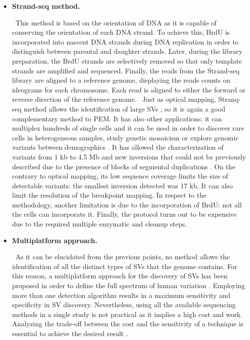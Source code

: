 \documentclass{article}
\begin{document}
\begin{itemize}
\item {\bf Strand-seq method.}

\
This method is based on the orientation of DNA as it is capable of conserving the orientation of each DNA strand. To achieve this, BrdU is incorporated into nascent DNA strands during DNA replication in order to distinguish between parental and daughter strands. Later, during the library preparation, the BrdU strands are selectively removed so that only template strands are amplified and sequenced. Finally, the reads from the Strand-seq library are aligned to a reference genome, displaying the reads counts on ideograms for each chromosome. Each read is aligned to either the forward or reverse direction of the reference genome.  
\
Just as optical mapping, Stranq-seq method allows the identification of large SVs \cite{sanders_characterizing_2016}, so it is again a good complementary method to PEM. It has also other applications: it can multiplex hundreds of single cells and it can be used in order to discover rare cells in heterogeneous samples, study genetic mosaicism or explore genomic variants between demographics \cite{sanders_characterizing_2016}. It has allowed the characterization of variants from 1 kb to 4.5 Mb and new inversions that could not be previously described due to the presence of blocks of segmental duplications \cite{sanders_characterizing_2016}. On the contrary to optical mapping, its low sequence coverage limits the size of detectable variants: the smallest inversion detected was 17 kb. It can also limit the resolution of the breakpoint mapping. In respect to the methodology, another limitation is due to the incorporation of BrdU: not all the cells can incorporate it. Finally, the protocol turns out to be expensive due to the required multiple enzymatic and cleanup steps.

\item {\bf Multiplatform approach.} 

\
As it can be elucidated from the previous points, no method allows the identification of all the distinct types of SVs that the genome contains. For this reason, a multiplatform approach for the discovery of SVs has been proposed in order to define the full spectrum of human variation \cite{chaisson_multi-platform_2019}. Employing more than one detection algorithm results in a maximum sensitivity and specificity in SV discovery. Nevertheless, using all the available sequencing methods in a single study is not practical as it implies a high cost and work. Analyzing the trade-off between the cost and the sensitivity of a technique is essential to achieve the desired result \cite{chaisson_multi-platform_2019}. 
\end{itemize}
\end{document}
